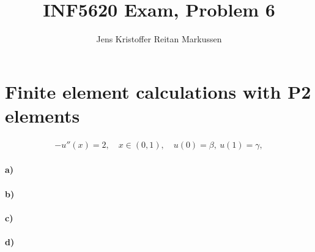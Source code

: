 \documentclass[11pt,a4paper]{article}
\author{Jens Kristoffer Reitan Markussen}
\title{INF5620 Exam, Problem 6}
\begin{document}
\maketitle
\section*{Finite element calculations with P2 elements}
\begin{align}
-u''(x) = 2,\quad x\in (0,1),\quad u(0)=\beta,\ u(1)=\gamma,
\end{align}
\paragraph*{a)}
\paragraph*{b)}
\paragraph*{c)}
\paragraph*{d)}
\end{document}
